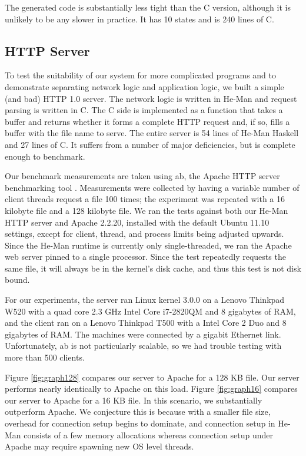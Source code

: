 \documentclass[preprint]{sigplanconf}
\begin{document}
The generated code is substantially less tight than the C version,
although it is unlikely to be any slower in practice. It has 10 states
and is 240 lines of C.

\subsection{HTTP Server}

To test the suitability of our system for more complicated programs
and to demonstrate separating network logic and application logic, we
built a simple (and bad) HTTP 1.0 server. The network logic is written
in He-Man and request parsing is written in C. The C side is
implemented as a function that takes a buffer and returns whether it
forms a complete HTTP request and, if so, fills a buffer with the
file name to serve. The entire server is 54 lines of He-Man Haskell and
27 lines of C. It suffers from a number of major deficiencies, but is
complete enough to benchmark.

Our benchmark measurements are taken using ab, the Apache HTTP server
benchmarking tool \cite{ApacheAB}. Measurements were collected by
having a variable number of client threads request a file 100 times;
the experiment was repeated with a 16 kilobyte file and a 128 kilobyte
file. We ran the tests against both our He-Man HTTP server and Apache
2.2.20, installed with the default Ubuntu 11.10 settings, except for
client, thread, and process limits being adjusted upwards. Since the
He-Man runtime is currently only single-threaded, we ran the Apache
web server pinned to a single processor. Since the test repeatedly
requests the same file, it will always be in the kernel's disk cache,
and thus this test is not disk bound.

For our experiments, the server ran Linux kernel 3.0.0 on a Lenovo
Thinkpad W520 with a quad core 2.3 GHz Intel Core i7-2820QM and 8
gigabytes of RAM, and the client ran on a Lenovo Thinkpad T500 with a
Intel Core 2 Duo and 8 gigabytes of RAM.  %
The machines were connected by a gigabit Ethernet link.
Unfortunately, ab is not particularly scalable, so we had trouble
testing with more than 500 clients.

Figure \ref{fig:graph128} compares our server to Apache for a 128 KB
file. Our server performs nearly identically to Apache on this load.
Figure \ref{fig:graph16} compares our server to Apache for a 16 KB
file. In this scenario, we substantially outperform Apache. We
conjecture this is because with a smaller file size, overhead for
connection setup begins to dominate, and connection setup in He-Man
consists of a few memory allocations whereas connection setup under
Apache may require spawning new OS level threads.
\end{document}
